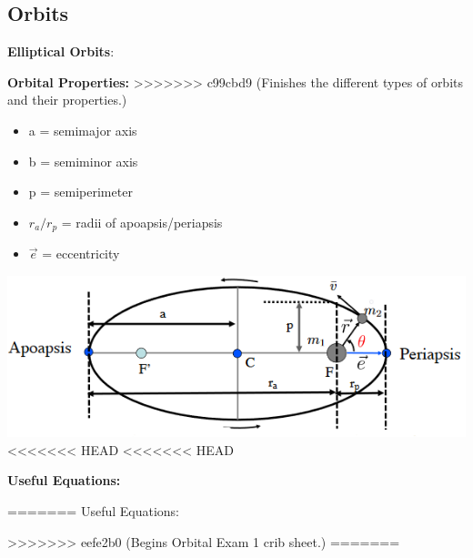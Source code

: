 \documentclass{article}
\begin{document}
\begin{multicols*}{3}
    \subsection*{Orbits}
    \textbf{Elliptical Orbits}:\par
    \textbf{Orbital Properties:}
>>>>>>> c99cbd9 (Finishes the different types of orbits and their properties.)
    \begin{itemize}
        \itemsep0em
        \item a = semimajor axis
        \item b = semiminor axis
        \item p = semiperimeter
        \item $r_a/r_p$ = radii of apoapsis/periapsis
        \item $\vec{e}$ = eccentricity
    \end{itemize}
    \includegraphics[width=\linewidth]{Figures/orbital_properties.png}
<<<<<<< HEAD
<<<<<<< HEAD

    \textbf{Useful Equations:}\par
=======
    Useful Equations:\par
>>>>>>> eefe2b0 (Begins Orbital Exam 1 crib sheet.)
=======


\end{multicols*}
\end{document}
